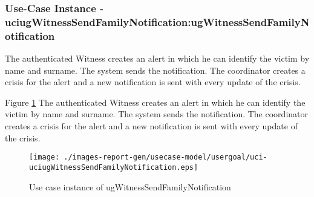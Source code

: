 
	\subsubsection{Use-Case Instance - uciugWitnessSendFamilyNotification:ugWitnessSendFamilyNotification}
	
	The authenticated Witness creates an alert in which he can identify the victim by name and surname. 
	The system sends the notification. The coordinator creates a crisis for the alert and a new notification is sent
	with every update of the crisis.		  
	\begin{operationmodel}
	
	\end{operationmodel} 

	
	Figure \ref{fig:lu.uni.lassy.excalibur.examples.icrash-RE-UC-uci-uciugWitnessSendFamilyNotification}
	The authenticated Witness creates an alert in which he can identify the victim by name and surname. 
	The system sends the notification. The coordinator creates a crisis for the alert and a new notification is sent
	with every update of the crisis.
	
	\begin{figure}[htbp]
	\begin{center}
	
	\texttt{[image: ./images-report-gen/usecase-model/usergoal/uci-uciugWitnessSendFamilyNotification.eps]}
	\end{center}
	\caption[lu.uni.lassy.excalibur.examples.icrash Sequence Diagram: uci-uciugWitnessSendFamilyNotification]{Use case instance of ugWitnessSendFamilyNotification}
	\label{fig:lu.uni.lassy.excalibur.examples.icrash-RE-UC-uci-uciugWitnessSendFamilyNotification}
	\end{figure}
	\vspace{0.5cm}
